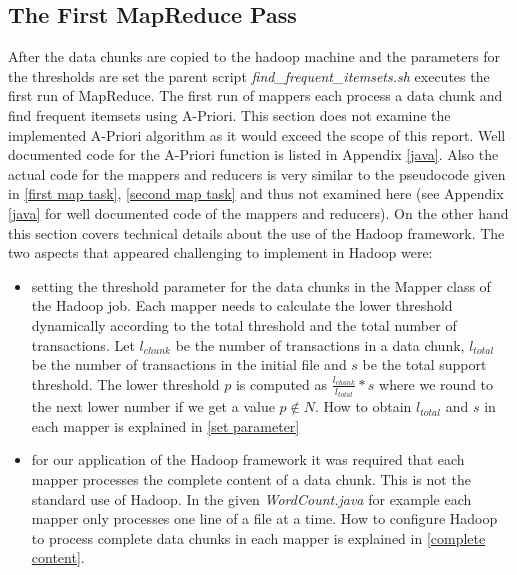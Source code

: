 \subsection{The First MapReduce Pass}\label{first pass details}
After the data chunks are copied to the hadoop machine and the parameters for the thresholds are set the parent script \textit{find\_frequent\_itemsets.sh} executes the first run of MapReduce. The first run of mappers each process a data chunk and find frequent itemsets using A-Priori. This section does not examine the implemented A-Priori algorithm as it would exceed the scope of this report. Well documented code for the A-Priori function is listed in Appendix \ref{java}. Also the actual code for the mappers and reducers is very similar to the pseudocode given in \ref{first map task}, \ref{second map task} and thus not examined here (see Appendix \ref{java} for well documented code of the mappers and reducers). On the other hand this section covers technical details about the use of the Hadoop framework. The two aspects that appeared challenging to implement in Hadoop were:
\begin{itemize}
\item setting the threshold parameter for the data chunks in the Mapper class of the Hadoop job. Each mapper needs to calculate the lower threshold dynamically according to the total threshold and the total number of transactions. Let $l_{chunk}$ be the number of transactions in a data chunk, $l_{total}$ be the number of transactions in the initial file and $s$ be the total support threshold. The lower threshold $p$ is computed as $\frac{l_{chunk}}{l_{total}}*s$ where we round to the next lower number if we get a value $p\not\in N$. How to obtain $l_{total}$ and $s$ in each mapper is explained in \ref{set parameter}
\item for our application of the Hadoop framework it was required that each mapper processes the complete content of a data chunk. This is not the standard use of Hadoop. In the given \textit{WordCount.java} for example each mapper only processes one line of a file at a time. How to configure Hadoop to process complete data chunks in each mapper is explained in \ref{complete content}.
\end{itemize}

